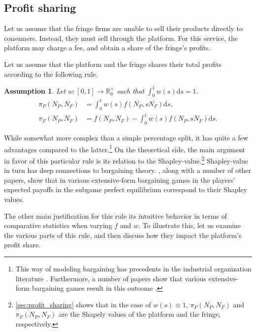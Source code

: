 \documentclass[a4paper]{article}
\newtheorem{assumption}{Assumption}
\newcommand{\ds}{\mathrm{d}s}
\begin{document}
\subsection{Profit sharing}

Let us assume that the fringe firms are unable to sell their products directly to consumers.
Instead, they must sell through the platform.
For this service, the platform may charge a fee, and obtain a share of the fringe's profits.

Let us assume that the platform and the fringe shares their total profits according to the following rule.
\begin{assumption}
    \label{ass:profit_sharing}
    Let $w: [0, 1] \to \mathbb{R}_0^+$ such that $\int_0^1 w(s) \ds = 1$. 
    \begin{align*}
        \pi_P(N_P, N_F) &= \int_0^1 w(s) f(N_P, s N_F) \ds, \\
        \pi_F(N_P, N_F) &= f(N_P, N_F) - \int_0^1 w(s) f(N_P, s N_F) \ds.
    \end{align*}
\end{assumption}
While somewhat more complex than a simple percentage split, it has quite a few advantages compared to the latter.\footnote{
    This way of modeling bargaining has precedents in the industrial organization literature \parencite[e.g.][]{hart1990property,segal2003collusion,inderst2003bargaining,montez2007downstream}.
    Furthermore, a number of papers show that various extensive-form bargaining games result in this outcome \parencite{gul1989bargaining,winter1994demand,hart1996bargaining,inderst2003bargaining,stole1996intra}.
}
On the theoretical side, the main argument in favor of this particular rule is its relation to the Shapley-value.\footnote{
    \cref{sec:profit_sharing} shows that in the case of $w(s) \equiv 1$, $\pi_P(N_P, N_F)$ and $\pi_F(N_P, N_F)$ are the Shapely values of the platform and the fringe, respectively.
}
Shapley-value in turn has deep connections to bargaining theory.
\textcite{gul1989bargaining,stole1996intra,hart1996bargaining,inderst2003bargaining}, along with a number of other papers, show that in various extensive-form bargaining games in the players' expected payoffs in the subgame perfect equilibrium correspond to their Shapley values.

The other main justification for this rule its intuitive behavior in terms of comparative statistics when varying $f$ and $w$.
To illustrate this, let us examine the various parts of this rule, and then discuss how they impact the platform's profit share.
\end{document}
